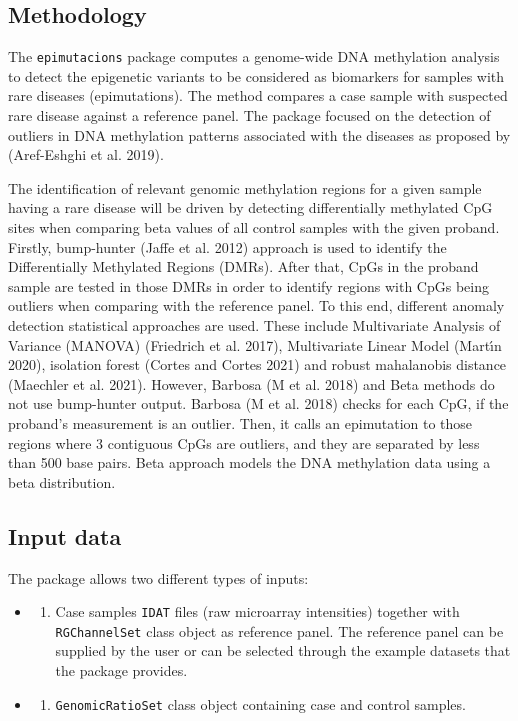 \documentclass[
]{article}
\providecommand{\tightlist}{%
  \setlength{\itemsep}{0pt}\setlength{\parskip}{0pt}}
\begin{document}
\hypertarget{methodology}{%
\subsection{Methodology}\label{methodology}}

The \texttt{epimutacions} package computes a genome-wide DNA methylation
analysis to detect the epigenetic variants to be considered as
biomarkers for samples with rare diseases (epimutations). The method
compares a case sample with suspected rare disease against a reference
panel. The package focused on the detection of outliers in DNA
methylation patterns associated with the diseases as proposed by
(Aref-Eshghi et al. 2019).

The identification of relevant genomic methylation regions for a given
sample having a rare disease will be driven by detecting differentially
methylated CpG sites when comparing beta values of all control samples
with the given proband. Firstly, bump-hunter (Jaffe et al. 2012)
approach is used to identify the Differentially Methylated Regions
(DMRs). After that, CpGs in the proband sample are tested in those DMRs
in order to identify regions with CpGs being outliers when comparing
with the reference panel. To this end, different anomaly detection
statistical approaches are used. These include Multivariate Analysis of
Variance (MANOVA) (Friedrich et al. 2017), Multivariate Linear Model
(Martı́n 2020), isolation forest (Cortes and Cortes 2021) and robust
mahalanobis distance (Maechler et al. 2021). However, Barbosa (M et al.
2018) and Beta methods do not use bump-hunter output. Barbosa (M et al.
2018) checks for each CpG, if the proband's measurement is an outlier.
Then, it calls an epimutation to those regions where 3 contiguous CpGs
are outliers, and they are separated by less than 500 base pairs. Beta
approach models the DNA methylation data using a beta distribution.

\hypertarget{input-data}{%
\subsection{Input data}\label{input-data}}

The package allows two different types of inputs:

\begin{itemize}
\item
  \begin{enumerate}
  \def\labelenumi{(\arabic{enumi})}
  \tightlist
  \item
    Case samples \texttt{IDAT} files (raw microarray intensities)
    together with \texttt{RGChannelSet} class object as reference panel.
    The reference panel can be supplied by the user or can be selected
    through the example datasets that the package provides.
  \end{enumerate}
\item
  \begin{enumerate}
  \def\labelenumi{(\arabic{enumi})}
  \setcounter{enumi}{1}
  \tightlist
  \item
    \texttt{GenomicRatioSet} class object containing case and control
    samples.
  \end{enumerate}
\end{itemize}
\end{document}
